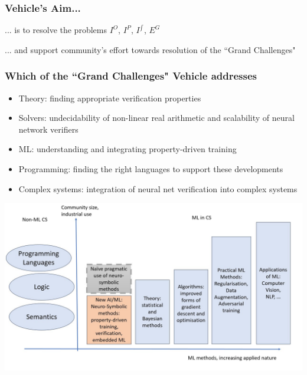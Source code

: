 \documentclass{beamer}
\begin{document}
\begin{frame}
\frametitle{\textbf{Vehicle}'s Aim...}

\alert{... is to resolve the problems $I^O$, $I^P$, $I^{\int}$, $E^G$}
\pause

... and support community's effort towards resolution of the ``Grand Challenges"

\end{frame}

  \begin{frame}
  \frametitle{Which of the ``Grand Challenges" \textbf{Vehicle} addresses}
  \footnotesize{
  \begin{itemize}
  \item Theory: finding appropriate verification properties
\item  Solvers: undecidability of non-linear real arithmetic  and scalability of neural network verifiers
\item \alert{ML: understanding and integrating property-driven training}
\item \alert{Programming: finding the right languages to support these developments}
\item \alert{Complex systems: integration of neural net verification into complex systems}
  \end{itemize}}

  \begin{center}
  \includegraphics[scale=.20]{Images/Slide1.jpg}
  \end{center}
\end{frame}
\end{document}
